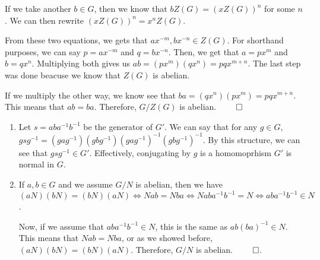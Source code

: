 \documentclass[12pt]{report}
\begin{document}
\begin{enumerate}[label=\alph*.]
    If we take another $b \in G$, then we know that $bZ(G) = (xZ(G))^n$ for some $n$. We can then rewrite $(xZ(G))^n = x^nZ(G)$.

    From these two equations, we gets that $ax^{-m}, bx^{-n} \in Z(G)$. For shorthand purposes, we can say $p = ax^{-m}$ and $q = bx^{-n}$. Then, we get that $a = px^m$ and $b = qx^n$. Multiplying both gives us $ab = (px^m)(qx^n) = pqx^{m+n}$. The last step was done beacuse we know that $Z(G)$ is abelian. 

    If we multiply the other way, we know see that $ba = (qx^n)(px^m) = pqx^{m+n}$. This means that $ab = ba$. Therefore, $G/Z(G)$ is abelian. $\qed$

\end{enumerate}

\sol
\begin{enumerate}[label=\alph*.]
    \item Let $s = aba^{-1}b^{-1}$ be the generator of $G'$. We can say that for any $g \in G$, $gsg^{-1} = (gag^{-1})(gbg^{-1})(gag^{-1})^{-1}(gbg^{-1})^{-1}$. By this structure, we can see that $gsg^{-1} \in G'$. Effectively, conjugating by $g$ is a homomoprhism $G'$ is normal in $G$.
    \item If $a,b \in G$ and we assume $G/N$ is abelian, then we have $(aN)(bN) = (bN)(aN) \Leftrightarrow Nab = Nba \Leftrightarrow Naba^{-1}b^{-1} = N \Leftrightarrow aba^{-1}b^{-1} \in N$.
    
    Now, if we assume that $aba^{-1}b^{-1} \in N$, this is the same as $ab(ba)^{-1} \in N$. This means that $Nab = Nba$, or as we showed before, $(aN)(bN) = (bN)(aN)$. Therefore, $G/N$ is abelian. $\qed$.
\end{enumerate}
\end{document}
